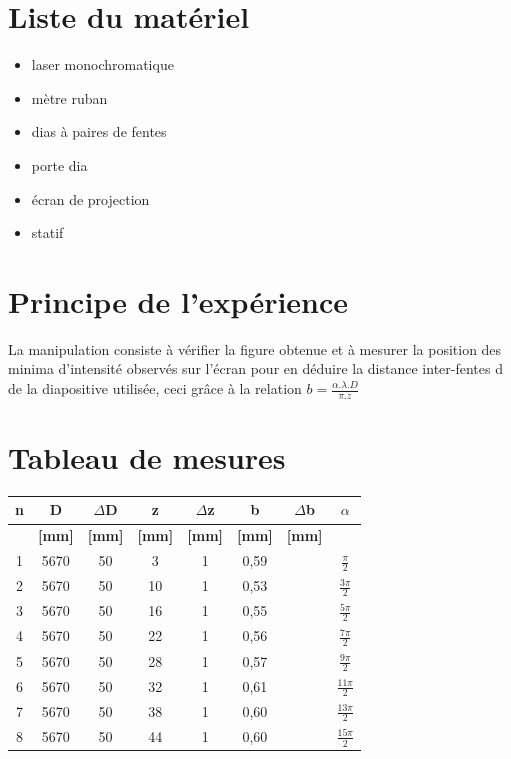 \documentclass[11pt,a4paper]{report}
\begin{document}
	\section{Liste du matériel}
	\begin{itemize}
	\item laser monochromatique
	\item mètre ruban
	\item dias à paires de fentes
	\item porte dia
	\item écran de projection
	\item statif
	\end{itemize}
	\section{Principe de l'expérience}
	La manipulation consiste à vérifier la figure obtenue et à mesurer la position des minima d'intensité observés sur l'écran pour en déduire la distance inter-fentes d de la diapositive utilisée, ceci grâce à la relation $b = \frac{\alpha .\lambda.D }{\pi.z}$
	\section{Tableau de mesures}
	\begin{center}		
	\begin{tabular}{|c|c|c|c|c|c|c|c|}
		\hline
		\bf n & \bf D & \bf $\Delta$D & \bf z & \bf $\Delta$z & \bf b & \bf $\Delta$b & \bf $\alpha$ \\
		\hline
		 & \bf [mm] & \bf [mm] & \bf [mm] & \bf [mm] & \bf [mm]  & \bf [mm]  &  \\
		\hline
		1 & 5670 & 50 & 3 &   1&0,59&  & $\frac{\pi}{2}$\\
		2 & 5670 & 50 & 10 &  1&0,53&  & $\frac{3\pi}{2}$\\
		3 & 5670 & 50 & 16 &  1&0,55&  & $\frac{5\pi}{2}$\\
		4 & 5670 & 50 & 22 &  1&0,56&  & $\frac{7\pi}{2}$\\
		5 & 5670 & 50 & 28 &  1&0,57&  & $\frac{9\pi}{2}$\\
		6 & 5670 & 50 & 32 &  1&0,61&  & $\frac{11\pi}{2}$\\
		7 & 5670 & 50 & 38 &  1&0,60&  & $\frac{13\pi}{2}$\\
		8 & 5670 & 50 & 44 &  1&0,60 &  & $\frac{15\pi}{2}$\\
		\hline
	\end{tabular}
	\end{center}
\end{document}
